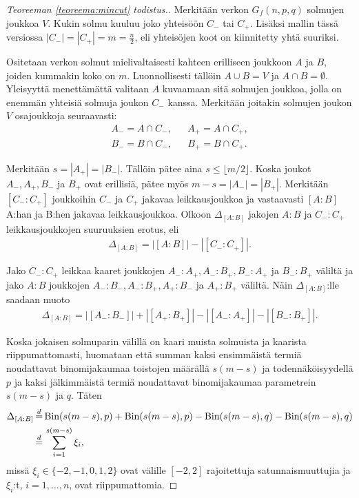 \documentclass[finnish,12pt,a4paper,pdftex,sci,utf8]{aaltothesis}
\newcommand\floor[1]{\lfloor#1\rfloor}
\begin{document}
\begin{proof}[Teoreeman \ref{teoreema:mincut} todistus.]
	Merkitään verkon $G_f(n,p,q)$ solmujen joukkoa $V$. Kukin solmu kuuluu joko yhteisöön $C_-$ tai $C_+$. Lisäksi mallin tässä versiossa $|C_-| = |C_+| = m = \frac{n}{2}$, eli yhteisöjen koot on kiinnitetty yhtä suuriksi.

        Ositetaan verkon solmut mielivaltaisesti kahteen erilliseen joukkoon $A$ ja $B$, joiden kummakin koko on $m$.
	Luonnollisesti tällöin $A \cup B = V$ ja $A \cap B = \emptyset$. Yleisyyttä menettämättä valitaan $A$ kuvaamaan sitä solmujen joukkoa, jolla on enemmän yhteisiä solmuja joukon $C_-$ kanssa. Merkitään joitakin solmujen joukon $V$ osajoukkoja seuraavasti:
\begin{eqnarray*}
	A_- = A \cap C_-, & & A_+ = A \cap C_+, \\
	B_- = B \cap C_-, & & B_+ = B \cap C_+.
\end{eqnarray*}

Merkitään $s = |A_+| = |B_-|$. Tällöin pätee aina $s \leq \floor{m/2}$. Koska joukot $A_-, A_+, B_-$ ja $B_+$ ovat erillisiä, pätee myös $m-s = |A_-| = |B_+|$. Merkitään $[C_- : C_+]$ joukkoihin $C_-$ ja $C_+$ jakavaa leikkausjoukkoa ja vastaavasti $[A:B]$ A:han ja B:hen jakavaa leikkausjoukkoa. Olkoon $\Delta_{[A:B]}$ jakojen $A:B$ ja $C_-:C_+$ leikkausjoukkojen suuruuksien erotus, eli
\begin{align*}
	\Delta_{[A:B]} = |[A:B]| - |[C_-:C_+]|.
\end{align*}

Jako $C_-:C_+$ leikkaa kaaret joukkojen $A_-:A_+, A_-:B_+, B_-:A_+$ ja $B_-:B_+$ väliltä ja jako $A:B$ joukkojen $A_-:B_-, A_-:B_+, A_+:B_-$ ja $A_+:B_+$ väliltä. Näin $\Delta_{[A:B]}$:lle saadaan muoto
\begin{align*}
	\Delta_{[A:B]} = |[A_-:B_-]| + |[A_+:B_+]| - |[A_-:A_+]| - |[B_-:B_+]|.
\end{align*}

Koska jokaisen solmuparin välillä on kaari muista solmuista ja kaarista riippumattomasti, huomataan että summan kaksi ensimmäistä termiä noudattavat binomijakaumaa toistojen määrällä $s(m-s)$ ja todennäköisyydellä $p$ ja kaksi jälkimmäistä termiä noudattavat binomijakaumaa parametrein $s(m-s)$ ja $q$. Täten
\begin{align*}
	\Delta_{[A:B]} &\,{\buildrel d \over =}\, \text{Bin}(s(m-s), p) + \text{Bin}(s(m-s), p) - \text{Bin}(s(m-s), q) - \text{Bin}(s(m-s), q) \\
	&\,{\buildrel d \over =}\, \sum_{i = 1}^{s(m-s)} \xi_i,
\end{align*}
missä $\xi_i \in \{-2, -1, 0, 1, 2\}$ ovat välille $[-2, 2]$ rajoitettuja satunnaismuuttujia ja $\xi_i$:t, $i = 1, \ldots, n$, ovat riippumattomia.


\end{proof}
\end{document}
